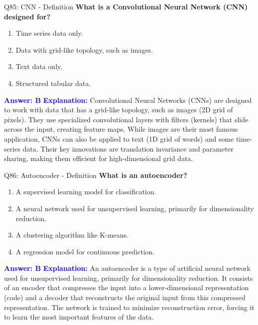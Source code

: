 \documentclass[8pt]{beamer}
\begin{document}
	\begin{frame}{Q85: CNN - Definition}
		\fontsize{6.5}{7.5}\selectfont
		\textbf{What is a Convolutional Neural Network (CNN) designed for?}
		\begin{enumerate}
			\item Time series data only.
			\item Data with grid-like topology, such as images.
			\item Text data only.
			\item Structured tabular data.
		\end{enumerate}
		\vspace{0.1cm}
		\textcolor{blue}{\textbf{Answer: B}}
		\vspace{0.1cm}
		\textcolor{blue}{\textbf{Explanation:}} Convolutional Neural Networks (CNNs) are designed to work with data that has a grid-like topology, such as images (2D grid of pixels). They use specialized convolutional layers with filters (kernels) that slide across the input, creating feature maps. While images are their most famous application, CNNs can also be applied to text (1D grid of words) and some time-series data. Their key innovations are translation invariance and parameter sharing, making them efficient for high-dimensional grid data.
	\end{frame}
	
	
	\begin{frame}{Q86: Autoencoder - Definition}
		\fontsize{6.5}{7.5}\selectfont
		\textbf{What is an autoencoder?}
		\begin{enumerate}
			\item A supervised learning model for classification.
			\item A neural network used for unsupervised learning, primarily for dimensionality reduction.
			\item A clustering algorithm like K-means.
			\item A regression model for continuous prediction.
		\end{enumerate}
		\vspace{0.1cm}
		\textcolor{blue}{\textbf{Answer: B}}
		\vspace{0.1cm}
		\textcolor{blue}{\textbf{Explanation:}} An autoencoder is a type of artificial neural network used for unsupervised learning, primarily for dimensionality reduction. It consists of an encoder that compresses the input into a lower-dimensional representation (code) and a decoder that reconstructs the original input from this compressed representation. The network is trained to minimize reconstruction error, forcing it to learn the most important features of the data.
	\end{frame}
	
\end{document}
